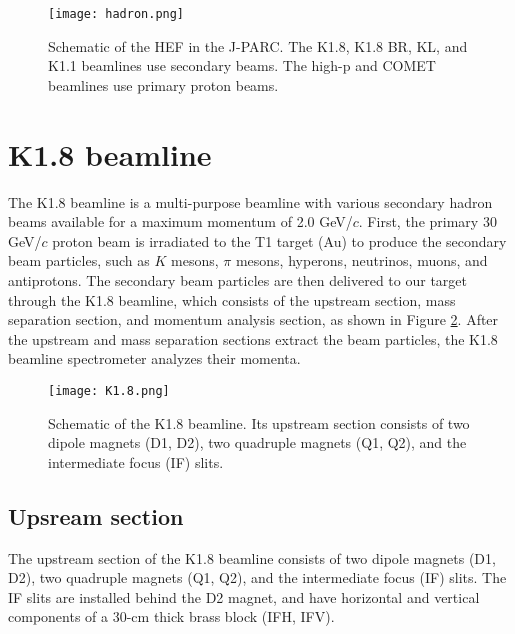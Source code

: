 \begin{figure}[!h]
 \begin{center}
   \texttt{[image: hadron.png]}
   \caption{Schematic of the HEF in the J-PARC. The K1.8, K1.8 BR, KL, and K1.1 beamlines use secondary beams. The high-p and COMET beamlines use primary proton beams.}
   \label{fig-hadron}
 \end{center}
\end{figure}

\clearpage 
\section{K1.8 beamline}
\label{sec-k18beamline}

The K1.8 beamline is a multi-purpose beamline with various secondary hadron beams available for a maximum momentum of 2.0 GeV/$c$. First, the primary 30 GeV/$c$ proton beam is irradiated to the T1 target (Au) to produce the secondary beam particles, such as $K$ mesons, $\pi$ mesons, hyperons, neutrinos, muons, and antiprotons. The secondary beam particles are then delivered to our target through the K1.8 beamline, which consists of the upstream section, mass separation section, and momentum analysis section, as shown in Figure \ref{fig-K1.8}. After the upstream and mass separation sections extract the beam particles, the K1.8 beamline spectrometer analyzes their momenta. 

\begin{figure}[!h]
 \begin{center}
   \texttt{[image: K1.8.png]}
   \caption{Schematic of the K1.8 beamline. Its upstream section consists of two dipole magnets (D1, D2), two quadruple magnets (Q1, Q2), and the intermediate focus (IF) slits.}
   \label{fig-K1.8}
 \end{center}
\end{figure}

\subsection{Upsream section}
The upstream section of the K1.8 beamline consists of two dipole magnets (D1, D2), two quadruple magnets (Q1, Q2), and the intermediate focus (IF) slits. The IF slits are installed behind the D2 magnet, and have horizontal and vertical components of a 30-cm thick brass block (IFH, IFV).

